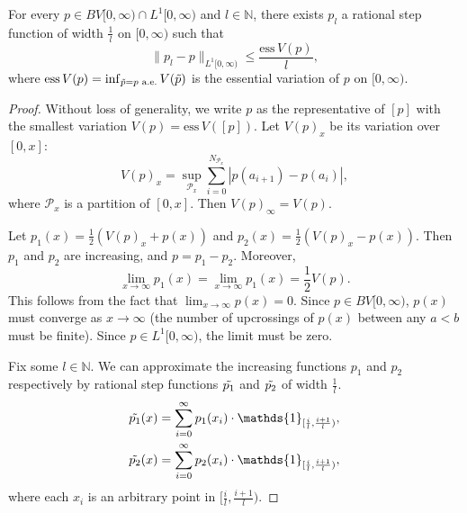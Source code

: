 \documentclass[10pt,a4paper]{amsart}
\newcommand{\ess}{\mathrm{ess}\,}
\begin{document}
\begin{lemma} \label{lm:Rstep_approx}
    For every $p\in BV[0,\infty)\cap L^1[0,\infty)$ and $l\in\mathbb{N}$, there exists $p_l$ a rational step function of width $\frac{1}{l}$ on $[0,\infty)$ such that
    \begin{equation*}
        \lVert p_l - p\rVert_{ L^1[0,\infty)} \leq \frac{\ess V(p)}{l},
    \end{equation*}
    where $\ess V(p)=\inf_{\Tilde{p}=p\text{ a.e.}}V(\Tilde{p})$ is the essential variation of $p$ on $[0,\infty)$.
\end{lemma}

\begin{proof}
    Without loss of generality, we write $p$ as the representative of $[p]$ with the smallest variation $V(p) = \ess V([p])$. Let $V(p)_x$ be its variation over $[0,x]$:
    \begin{equation*}
        V(p)_x = \sup_{\mathcal{P}_x}\sum_{i=0}^{N_{\mathcal{P}_x}} |p(a_{i+1})-p(a_i)|,
    \end{equation*}
    where $\mathcal{P}_x$ is a partition of $[0,x]$. Then $V(p)_\infty=V(p)$.
    
    Let $p_1(x) = \frac{1}{2}(V(p)_x+p(x))$ and $p_2(x) = \frac{1}{2}(V(p)_x-p(x))$. Then $p_1$ and $p_2$ are increasing, and $p=p_1-p_2$. Moreover,
    \begin{equation*}
        \lim_{x\rightarrow\infty}p_1(x) = \lim_{x\rightarrow\infty}p_1(x) = \frac{1}{2}V(p).
    \end{equation*}
    This follows from the fact that $\lim_{x\rightarrow\infty}p(x) = 0$. Since $p\in BV[0,\infty)$, $p(x)$ must converge as $x\rightarrow\infty$ (the number of upcrossings of $p(x)$ between any $a<b$ must be finite). Since $p\in L^1[0,\infty)$, the limit must be zero.

    Fix some $l\in\mathbb{N}$. We can approximate the increasing functions $p_1$ and $p_2$ respectively by rational step functions $\Tilde{p_1}$ and $\Tilde{p_2}$ of width $\frac{1}{l}$.
    \begin{align*}
        \Tilde{p_1}(x) &= \sum_{i=0}^\infty p_1(x_i)\cdot\mathds{1}_{[\frac{i}{l},\frac{i+1}{l})},\\
        \Tilde{p_2}(x) &= \sum_{i=0}^\infty p_2(x_i)\cdot\mathds{1}_{[\frac{i}{l},\frac{i+1}{l})},
    \end{align*}
    where each $x_i$ is an arbitrary point in $[\frac{i}{l},\frac{i+1}{l})$.


\end{proof}
\end{document}
